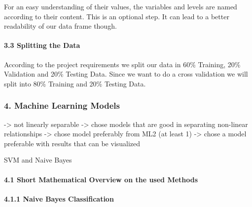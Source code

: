 \documentclass[
]{article}
\begin{document}
\hfill\break
For an easy understanding of their values, the variables and levels are
named according to their content. This is an optional step. It can lead
to a better readability of our data frame though.

\hypertarget{splitting-the-data}{%
\paragraph{3.3 Splitting the Data}\label{splitting-the-data}}

\hfill\break
According to the project requirements we split our data in 60\%
Training, 20\% Validation and 20\% Testing Data. Since we want to do a
cross validation we will split into 80\% Training and 20\% Testing Data.

\hypertarget{machine-learning-models}{%
\subsubsection{4. Machine Learning
Models}\label{machine-learning-models}}

-\textgreater{} not linearly separable -\textgreater{} chose models that
are good in separating non-linear relationships -\textgreater{} chose
model preferably from ML2 (at least 1) -\textgreater{} chose a model
preferable with results that can be visualized

SVM and Naive Bayes

\hypertarget{short-mathematical-overview-on-the-used-methods}{%
\paragraph{4.1 Short Mathematical Overview on the used
Methods}\label{short-mathematical-overview-on-the-used-methods}}

\hfill\break

\hypertarget{naive-bayes-classification}{%
\paragraph{4.1.1 Naive Bayes
Classification}\label{naive-bayes-classification}}

~
\end{document}
